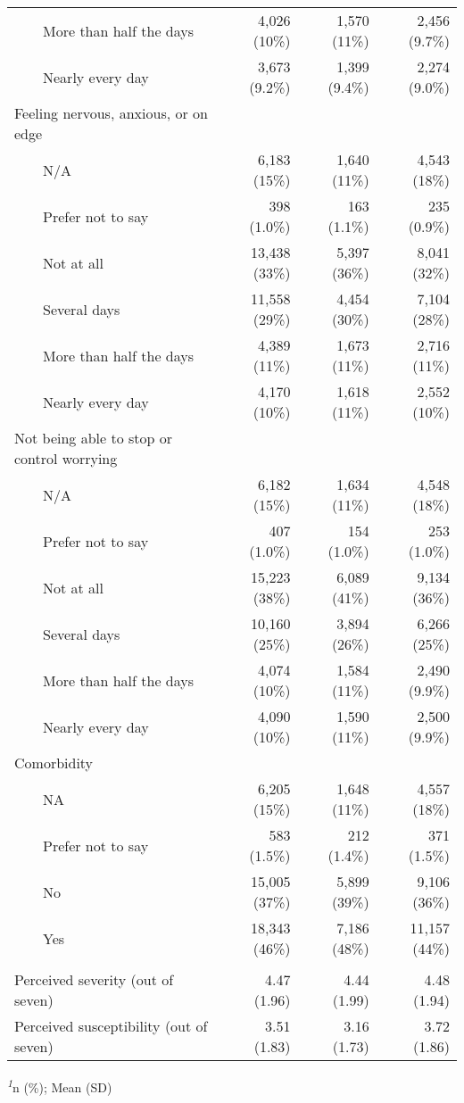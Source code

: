 \documentclass[
]{article}
\begin{document}
\begin{longtable}{lrrr}
    More than half the days & 4,026 (10\%) & 1,570 (11\%) & 2,456 (9.7\%) \\ 
    Nearly every day & 3,673 (9.2\%) & 1,399 (9.4\%) & 2,274 (9.0\%) \\ 
Feeling nervous, anxious, or on edge &  &  &  \\ 
    N/A & 6,183 (15\%) & 1,640 (11\%) & 4,543 (18\%) \\ 
    Prefer not to say & 398 (1.0\%) & 163 (1.1\%) & 235 (0.9\%) \\ 
    Not at all & 13,438 (33\%) & 5,397 (36\%) & 8,041 (32\%) \\ 
    Several days & 11,558 (29\%) & 4,454 (30\%) & 7,104 (28\%) \\ 
    More than half the days & 4,389 (11\%) & 1,673 (11\%) & 2,716 (11\%) \\ 
    Nearly every day & 4,170 (10\%) & 1,618 (11\%) & 2,552 (10\%) \\ 
Not being able to stop or control worrying &  &  &  \\ 
    N/A & 6,182 (15\%) & 1,634 (11\%) & 4,548 (18\%) \\ 
    Prefer not to say & 407 (1.0\%) & 154 (1.0\%) & 253 (1.0\%) \\ 
    Not at all & 15,223 (38\%) & 6,089 (41\%) & 9,134 (36\%) \\ 
    Several days & 10,160 (25\%) & 3,894 (26\%) & 6,266 (25\%) \\ 
    More than half the days & 4,074 (10\%) & 1,584 (11\%) & 2,490 (9.9\%) \\ 
    Nearly every day & 4,090 (10\%) & 1,590 (11\%) & 2,500 (9.9\%) \\ 
Comorbidity &  &  &  \\ 
    NA & 6,205 (15\%) & 1,648 (11\%) & 4,557 (18\%) \\ 
    Prefer not to say & 583 (1.5\%) & 212 (1.4\%) & 371 (1.5\%) \\ 
    No & 15,005 (37\%) & 5,899 (39\%) & 9,106 (36\%) \\ 
    Yes & 18,343 (46\%) & 7,186 (48\%) & 11,157 (44\%) \\ 
\midrule\addlinespace[2.5pt]
\multicolumn{4}{l}{Perception of illness threat} \\ 
\midrule\addlinespace[2.5pt]
Perceived severity (out of seven) & 4.47 (1.96) & 4.44 (1.99) & 4.48 (1.94) \\ 
Perceived susceptibility (out of seven) & 3.51 (1.83) & 3.16 (1.73) & 3.72 (1.86) \\ 
\bottomrule
\end{longtable}
\begin{minipage}{\linewidth}
\textsuperscript{\textit{1}}n (\%); Mean (SD)\\
\end{minipage}
\end{document}
